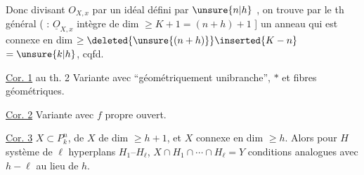 
Donc divisant $O_{X,x}$ par un idéal défini
par $\unsure{n|h}$ , on  trouve par
le th général  ( :
$\underline O_{X,x}$ intègre   de
dim $\geq K+1=(n+h)+1$ ] un anneau
qui est connexe en dim $\geq\deleted{\unsure{(n+h)}}\inserted{K-n}$
$=\unsure{k|h}$, cqfd.

\uline{Cor. 1} au th. 2 Variante
avec  ``géométriquement 
unibranche'', $*$ et fibres géométriques.

\uline{Cor. 2} Variante avec $f$ propre
 ouvert.

\uline{Cor. 3} $X\subset P^n_k$, 
de $X$ de dim $\geq h+1$, et $X$ connexe
en dim $\geq h$. Alors pour $H$ système
de $\ell$ hyperplans $H_1$--$H_\ell$,  
$X\cap H_1\cap\cdots\cap H_\ell=Y$
 conditions analogues avec
$h-\ell$ au lieu de $h$.


